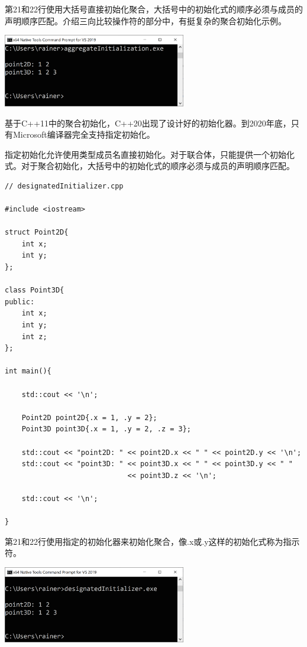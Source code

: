 第21和22行使用大括号直接初始化聚合，大括号中的初始化式的顺序必须与成员的声明顺序匹配。介绍三向比较操作符的部分中，有挺复杂的聚合初始化示例。

\begin{center}
\includegraphics[width=0.6\textwidth]{content/3/chapter4/images/32.png}\\
\end{center}

基于C++11中的聚合初始化，C++20出现了设计好的初始化器。到2020年底，只有Microsoft编译器完全支持指定初始化。


指定初始化允许使用类型成员名直接初始化。对于联合体，只能提供一个初始化式。对于聚合初始化，大括号中的初始化式的顺序必须与成员的声明顺序匹配。

\begin{lstlisting}[style=styleCXX]
// designatedInitializer.cpp

#include <iostream>

struct Point2D{
	int x;
	int y;
};

class Point3D{
public:
	int x;
	int y;
	int z;
};

int main(){
	
	std::cout << '\n';
	
	Point2D point2D{.x = 1, .y = 2};
	Point3D point3D{.x = 1, .y = 2, .z = 3};
	
	std::cout << "point2D: " << point2D.x << " " << point2D.y << '\n';
	std::cout << "point3D: " << point3D.x << " " << point3D.y << " "
							 << point3D.z << '\n';
	
	std::cout << '\n';
	
}
\end{lstlisting}

第21和22行使用指定的初始化器来初始化聚合，像.x或.y这样的初始化式称为指示符。

\begin{center}
\includegraphics[width=0.6\textwidth]{content/3/chapter4/images/33.png}\\
\end{center}

